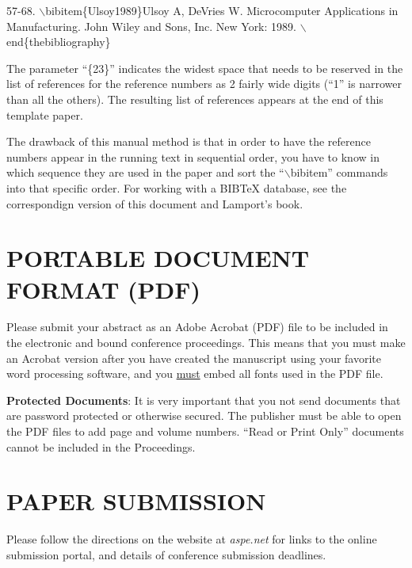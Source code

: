 \documentclass[letterpaper,10pt,twocolumn]{../aspe}
\begin{document}
{\begin{flushleft}
        \hspace*{6mm} 57-68.\linebreak
        \hspace*{3mm}$\backslash$bibitem\{Ulsoy1989\}Ulsoy A, DeVries W.\linebreak
        \hspace*{6mm} Microcomputer Applications in\linebreak
        \hspace*{6mm} Manufacturing.  John Wiley and\linebreak
        \hspace*{6mm} Sons, Inc.  New York: 1989.\linebreak
        \hspace*{3mm}$\backslash$end\{thebibliography\}
\end{flushleft}
}
The parameter ``\{23\}'' indicates the widest space that needs to be
reserved in the list of references for the reference numbers
as 2 fairly wide digits (``1'' is narrower
than all the others).  The resulting list of references appears at the
end of this template paper.

The drawback of this manual method is that in order to
have the reference numbers appear in the running text in sequential order,
you have to know in which sequence they are used in the paper and sort the
``$\backslash$bibitem'' commands into that specific order.  For working with a
BIBTeX database, see the correspondign version of this document and
Lamport's book.\cite{Lamport1986}

\section*{PORTABLE DOCUMENT FORMAT (PDF)}
Please submit your abstract as an Adobe Acrobat (PDF) file to be included
in the electronic and bound conference proceedings.  This means that you
must make an Acrobat version after you have created the manuscript using
your favorite word processing software, and you
\underline{must} embed all fonts used in the PDF file.

    {\bf Protected Documents}:  It is very important that you not send documents that are password protected or otherwise secured.  The publisher must be able to open the PDF files to add page and volume numbers. ``Read or Print Only'' documents cannot be included in the Proceedings.

\section*{PAPER SUBMISSION}
Please follow the directions on the website at \emph{aspe.net} for links to the online submission portal, and details of conference submission deadlines.
\end{document}
